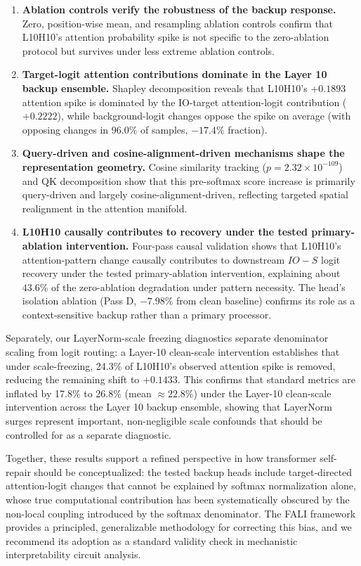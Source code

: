 \documentclass[12pt,a4paper]{article}
\begin{document}
\begin{enumerate}
  \item \textbf{Ablation controls verify the robustness of the backup response.} Zero, position-wise mean, and resampling ablation controls confirm that L10H10's attention probability spike is not specific to the zero-ablation protocol but survives under less extreme ablation controls.

  \item \textbf{Target-logit attention contributions dominate in the Layer 10 backup ensemble.} Shapley decomposition reveals that L10H10's $+0.1893$ attention spike is dominated by the IO-target attention-logit contribution ($+0.2222$), while background-logit changes oppose the spike on average (with opposing changes in $96.0\%$ of samples, $-17.4\%$ fraction).

  \item \textbf{Query-driven and cosine-alignment-driven mechanisms shape the representation geometry.} Cosine similarity tracking ($p = 2.32 \times 10^{-109}$) and QK decomposition show that this pre-softmax score increase is primarily query-driven and largely cosine-alignment-driven, reflecting targeted spatial realignment in the attention manifold.

  \item \textbf{L10H10 causally contributes to recovery under the tested primary-ablation intervention.} Four-pass causal validation shows that L10H10's attention-pattern change causally contributes to downstream $IO - S$ logit recovery under the tested primary-ablation intervention, explaining about $43.6\%$ of the zero-ablation degradation under pattern necessity. The head's isolation ablation (Pass D, $-7.98\%$ from clean baseline) confirms its role as a context-sensitive backup rather than a primary processor.
\end{enumerate}

Separately, our LayerNorm-scale freezing diagnostics separate denominator scaling from logit routing: a Layer-10 clean-scale intervention establishes that under scale-freezing, 24.3\% of L10H10's observed attention spike is removed, reducing the remaining shift to $+0.1433$. This confirms that standard metrics are inflated by 17.8\% to 26.8\% (mean $\approx 22.8\%$) under the Layer-10 clean-scale intervention across the Layer 10 backup ensemble, showing that LayerNorm surges represent important, non-negligible scale confounds that should be controlled for as a separate diagnostic.

Together, these results support a refined perspective in how transformer
self-repair should be conceptualized: the tested backup heads include target-directed
attention-logit changes that cannot be explained by softmax normalization alone,
whose true computational contribution has been systematically
obscured by the non-local coupling introduced by the softmax denominator. The
FALI framework provides a principled, generalizable methodology for correcting
this bias, and we recommend its adoption as a standard validity check in
mechanistic interpretability circuit analysis.
\end{document}
